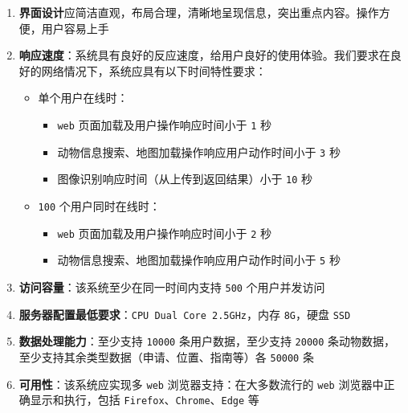 \documentclass[12pt,a4paper,UTF8]{article}
\begin{document}
\begin{enumerate}
    \item \textbf{界面设计}应简洁直观，布局合理，清晰地呈现信息，突出重点内容。操作方便，用户容易上手
    \item \textbf{响应速度}：系统具有良好的反应速度，给用户良好的使用体验。我们要求在良好的网络情况下，系统应具有以下时间特性要求：
    \begin{itemize}
        \item 单个用户在线时：
        \begin{itemize}
            \item \verb|web| 页面加载及用户操作响应时间小于 \verb|1| 秒
            \item 动物信息搜索、地图加载操作响应用户动作时间小于 \verb|3| 秒
            \item 图像识别响应时间（从上传到返回结果）小于 \verb|10| 秒
        \end{itemize}
        \item \verb|100| 个用户同时在线时：
        \begin{itemize}
            \item \verb|web| 页面加载及用户操作响应时间小于 \verb|2| 秒
            \item 动物信息搜索、地图加载操作响应用户动作时间小于 \verb|5| 秒
        \end{itemize}
    \end{itemize}
    \item \textbf{访问容量}：该系统至少在同一时间内支持 \verb|500| 个用户并发访问
    \item \textbf{服务器配置最低要求}：\verb|CPU Dual Core 2.5GHz|，内存 \verb|8G|，硬盘 \verb|SSD|
    \item \textbf{数据处理能力}：至少支持 \verb|10000| 条用户数据，至少支持 \verb|20000| 条动物数据，至少支持其余类型数据（申请、位置、指南等）各 \verb|50000| 条
    \item \textbf{可用性}：该系统应实现多 \verb|web| 浏览器支持：在大多数流行的 \verb|web| 浏览器中正确显示和执行，包括 \verb|Firefox|、\verb|Chrome|、\verb|Edge| 等
\end{enumerate}
\end{document}
